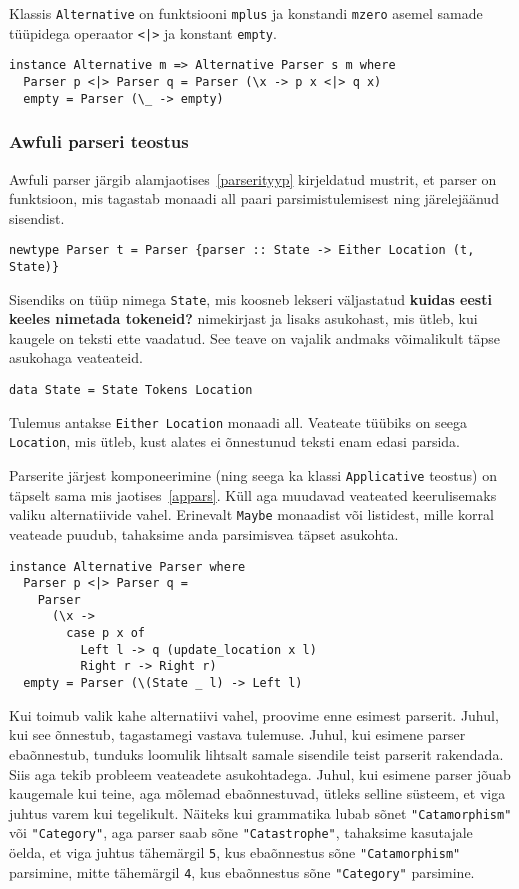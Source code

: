 \documentclass[12pt]{article}
\newcommand\markus[1]{\textcolor{roheline}{\textbf{#1}}}
\begin{document}
        Klassis \verb!Alternative! on funktsiooni \verb!mplus! ja konstandi \verb!mzero! asemel samade tüüpidega operaator \verb!<|>! ja konstant \verb!empty!.

        \begin{verbatim}instance Alternative m => Alternative Parser s m where
  Parser p <|> Parser q = Parser (\x -> p x <|> q x)
  empty = Parser (\_ -> empty)\end{verbatim}
      \subsubsection{Awfuli parseri teostus}
        Awfuli parser järgib alamjaotises~\ref{parserityyp} kirjeldatud mustrit, et parser on funktsioon, mis tagastab monaadi all paari parsimistulemisest ning järelejäänud sisendist.

        \begin{verbatim}newtype Parser t = Parser {parser :: State -> Either Location (t, State)}\end{verbatim}

        Sisendiks on tüüp nimega \verb!State!, mis koosneb lekseri väljastatud \markus{kuidas eesti keeles nimetada tokeneid?} nimekirjast ja lisaks asukohast, mis ütleb, kui kaugele on teksti ette vaadatud. See teave on vajalik andmaks võimalikult täpse asukohaga veateateid.

        \begin{verbatim}data State = State Tokens Location\end{verbatim}

        Tulemus antakse \verb!Either Location! monaadi all. Veateate tüübiks on seega \verb!Location!, mis ütleb, kust alates ei õnnestunud teksti enam edasi parsida.

        Parserite järjest komponeerimine (ning seega ka klassi \verb!Applicative! teostus) on täpselt sama mis jaotises~\ref{appars}. Küll aga muudavad veateated keerulisemaks valiku alternatiivide vahel. Erinevalt \verb!Maybe! monaadist või listidest, mille korral veateade puudub, tahaksime anda parsimisvea täpset asukohta.

        \begin{verbatim}instance Alternative Parser where
  Parser p <|> Parser q =
    Parser
      (\x ->
        case p x of
          Left l -> q (update_location x l)
          Right r -> Right r)
  empty = Parser (\(State _ l) -> Left l)\end{verbatim}

      Kui toimub valik kahe alternatiivi vahel, proovime enne esimest parserit. Juhul, kui see õnnestub, tagastamegi vastava tulemuse. Juhul, kui esimene parser ebaõnnestub, tunduks loomulik lihtsalt samale sisendile teist parserit rakendada. Siis aga tekib probleem veateadete asukohtadega. Juhul, kui esimene parser jõuab kaugemale kui teine, aga mõlemad ebaõnnestuvad, ütleks selline süsteem, et viga juhtus varem kui tegelikult. Näiteks kui grammatika lubab sõnet \verb!"Catamorphism"! või \verb!"Category"!, aga parser saab sõne \verb!"Catastrophe"!, tahaksime kasutajale öelda, et viga juhtus tähemärgil \verb!5!, kus ebaõnnestus sõne \verb!"Catamorphism"! parsimine, mitte tähemärgil \verb!4!, kus ebaõnnestus sõne \verb!"Category"! parsimine.
\end{document}

